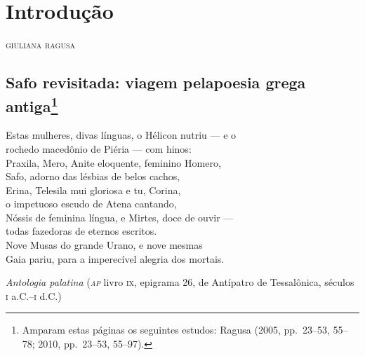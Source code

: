 \chapter*{Introdução}

\begin{flushright}
\textsc{giuliana ragusa}
\end{flushright}

\section*{Safo revisitada: viagem pela\break poesia grega
antiga\protect\footnote{\MakeUppercase{A}mparam estas páginas os seguintes estudos:
\MakeUppercase{R}agusa (2005, pp.~23--53, 55--78; 2010, pp.~23--53, 55--97).}}

\epigraph{Estas mulheres, divas línguas, o Hélicon nutriu --- e o  \\
rochedo macedônio de Piéria --- com hinos: \\
Praxila, Mero, Anite eloquente, feminino Homero, \\
Safo, adorno das lésbias de belos cachos, \\
Erina, Telesila mui gloriosa e tu, Corina, \\
o impetuoso escudo de Atena cantando, \\
Nóssis de feminina língua, e Mirtes, doce de ouvir ---  \\
todas fazedoras de eternos escritos. \\
Nove Musas do grande Urano, e nove mesmas \\
Gaia pariu, para a imperecível alegria dos mortais.}
{\textit{Antologia palatina} (\textit{\textsc{ap}} livro \textsc{ix}, epigrama 26, de Antípatro de Tessalônica,
séculos \textsc{i} a.C.--\textsc{i} d.C.)\footnotemark}


